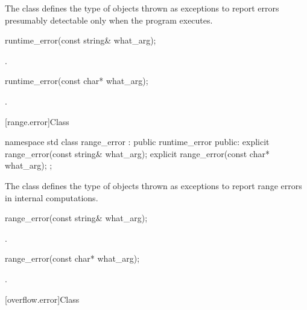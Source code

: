 \pnum
The class
defines the type of objects thrown as exceptions to report errors presumably detectable only
when the program executes.

%
\begin{itemdecl}
runtime_error(const string& what_arg);
\end{itemdecl}

\begin{itemdescr}
\pnum
\ensures
{}.
\end{itemdescr}

%
\begin{itemdecl}
runtime_error(const char* what_arg);
\end{itemdecl}

\begin{itemdescr}
\pnum
\ensures
{}.
\end{itemdescr}

[range.error]{Class }

%
\begin{codeblock}
namespace std {
  class range_error : public runtime_error {
  public:
    explicit range_error(const string& what_arg);
    explicit range_error(const char* what_arg);
  };
}
\end{codeblock}

\pnum
The class
defines the type of objects thrown as exceptions to report range errors
in internal computations.

%
\begin{itemdecl}
range_error(const string& what_arg);
\end{itemdecl}

\begin{itemdescr}
\pnum
\ensures
{}.
\end{itemdescr}

%
\begin{itemdecl}
range_error(const char* what_arg);
\end{itemdecl}

\begin{itemdescr}
\pnum
\ensures
{}.
\end{itemdescr}

[overflow.error]{Class }

